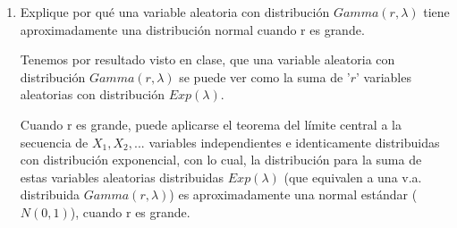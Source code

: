 \documentclass[11pt,a4paper]{report}
\begin{document}
\begin{enumerate}
		\item{
			Explique por qué una variable aleatoria con distribución 
			$Gamma(r,\lambda)$ tiene aproximadamente una distribución normal 
			cuando r es grande. \\
		}

			Tenemos por resultado visto en clase, que una variable aleatoria con
			distribución $Gamma(r, \lambda)$ se puede ver como la suma de '$r$'
			variables aleatorias con distribución $Exp(\lambda)$. 

			
			Cuando r es grande, puede aplicarse el teorema del límite central
			a la secuencia de $X_1, X_2, ...$ variables independientes e 
			identicamente distribuidas con distribución exponencial, con lo cual,
			la distribución para la suma de estas variables aleatorias distribuidas 
			$Exp(\lambda)$ (que equivalen a una v.a. distribuida $Gamma(r, \lambda)$)
			es aproximadamente una normal estándar ($N(0,1)$), cuando r es grande.
		
	\end{enumerate}
\end{document}
